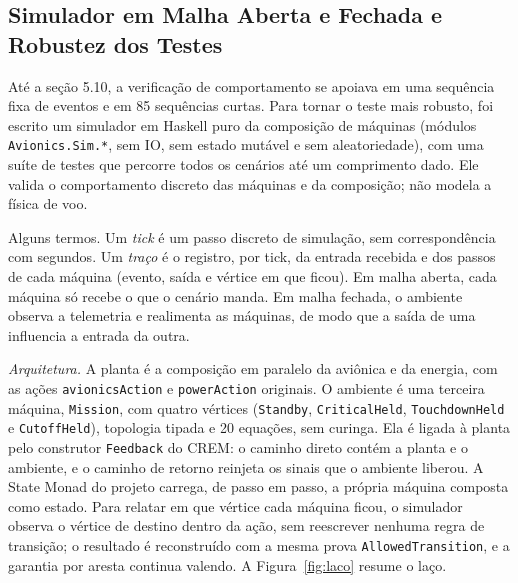 \documentclass[12pt,a4paper]{article}
\begin{document}
\subsection{Simulador em Malha Aberta e Fechada e Robustez dos Testes}

Até a seção 5.10, a verificação de comportamento se apoiava em uma sequência fixa de eventos e em 85 sequências curtas. Para tornar o teste mais robusto, foi escrito um simulador em Haskell puro da composição de máquinas (módulos \texttt{Avionics.Sim.*}, sem IO, sem estado mutável e sem aleatoriedade), com uma suíte de testes que percorre todos os cenários até um comprimento dado. Ele valida o comportamento discreto das máquinas e da composição; não modela a física de voo.

Alguns termos. Um \textit{tick} é um passo discreto de simulação, sem correspondência com segundos. Um \textit{traço} é o registro, por tick, da entrada recebida e dos passos de cada máquina (evento, saída e vértice em que ficou). Em malha aberta, cada máquina só recebe o que o cenário manda. Em malha fechada, o ambiente observa a telemetria e realimenta as máquinas, de modo que a saída de uma influencia a entrada da outra.

\textit{Arquitetura.} A planta é a composição em paralelo da aviônica e da energia, com as ações \texttt{avionicsAction} e \texttt{powerAction} originais. O ambiente é uma terceira máquina, \texttt{Mission}, com quatro vértices (\texttt{Standby}, \texttt{CriticalHeld}, \texttt{TouchdownHeld} e \texttt{CutoffHeld}), topologia tipada e 20 equações, sem curinga. Ela é ligada à planta pelo construtor \texttt{Feedback} do CREM: o caminho direto contém a planta e o ambiente, e o caminho de retorno reinjeta os sinais que o ambiente liberou. A State Monad do projeto carrega, de passo em passo, a própria máquina composta como estado. Para relatar em que vértice cada máquina ficou, o simulador observa o vértice de destino dentro da ação, sem reescrever nenhuma regra de transição; o resultado é reconstruído com a mesma prova \texttt{AllowedTransition}, e a garantia por aresta continua valendo. A Figura~\ref{fig:laco} resume o laço.
\end{document}
